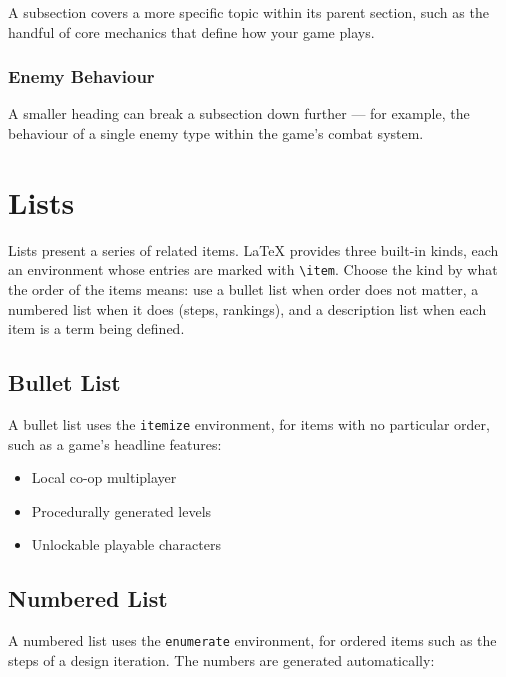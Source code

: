 \documentclass[a4paper,twoside,twocolumn]{IEEEtran}
\begin{document}
A subsection covers a more specific topic within its parent section, such as the
handful of core mechanics that define how your game plays.


\subsubsection{Enemy Behaviour}

A smaller heading can break a subsection down further --- for example, the
behaviour of a single enemy type within the game's combat system.



\section{Lists}
\label{sec:lists}

Lists present a series of related items. LaTeX provides three built-in kinds,
each an environment whose entries are marked with \verb|\item|. Choose the kind
by what the order of the items means: use a bullet list when order does not
matter, a numbered list when it does (steps, rankings), and a description list
when each item is a term being defined.


\subsection{Bullet List}

A bullet list uses the \texttt{itemize} environment, for items with no
particular order, such as a game's headline features:

\begin{itemize}
    \item Local co-op multiplayer
    \item Procedurally generated levels
    \item Unlockable playable characters
\end{itemize}


\subsection{Numbered List}

A numbered list uses the \texttt{enumerate} environment, for ordered items such
as the steps of a design iteration. The numbers are generated automatically:
\end{document}
